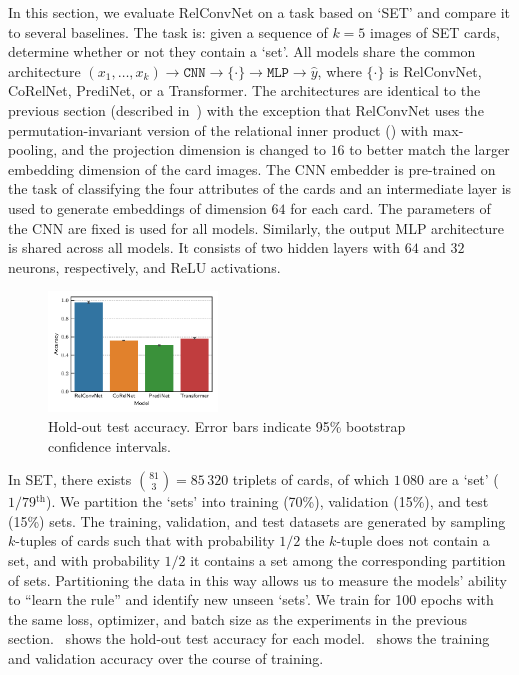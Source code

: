 In this section, we evaluate RelConvNet on a task based on `SET' and compare it to several baselines. The task is: given a sequence of $k=5$ images of SET cards, determine whether or not they contain a `set'. All models share the common architecture $(x_1, \ldots, x_k) \to \texttt{CNN} \to \{ \cdot \} \to \texttt{MLP} \to \hat{y}$, where $\{\cdot\}$ is RelConvNet, CoRelNet, PrediNet, or a Transformer. The architectures are identical to the previous section (described in~) with the exception that RelConvNet uses the permutation-invariant version of the relational inner product () with max-pooling, and the projection dimension is changed to $16$ to better match the larger embedding dimension of the card images. The CNN embedder is pre-trained on the task of classifying the four attributes of the cards and an intermediate layer is used to generate embeddings of dimension $64$ for each card. The parameters of the CNN are fixed is used for all models. Similarly, the output MLP architecture is shared across all models. It consists of two hidden layers with $64$ and $32$ neurons, respectively, and ReLU activations.

\begin{figure}
    \centering
    \includegraphics[width=0.4\textwidth]{figs/experiments/contains_set_acc.pdf}
    \caption{\footnotesize Hold-out test accuracy. Error bars indicate 95\% bootstrap confidence intervals.}\label{fig:contains_set_acc}
\end{figure}

In SET, there exists $\binom{81}{3} = 85\,320$ triplets of cards, of which $1\,080$ are a `set' ($1/79{}^{\mathrm{th}}$). We partition the `sets' into training (70\%), validation (15\%), and test (15\%) sets. The training, validation, and test datasets are generated by sampling $k$-tuples of cards such that with probability $1/2$ the $k$-tuple does not contain a set, and with probability $1/2$ it contains a set among the corresponding partition of sets. Partitioning the data in this way allows us to measure the models' ability to ``learn the rule'' and identify new unseen `sets'. We train for 100 epochs with the same loss, optimizer, and batch size as the experiments in the previous section.~ shows the hold-out test accuracy for each model.~ shows the training and validation accuracy over the course of training.

